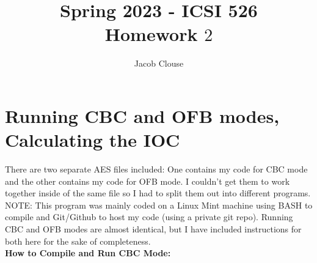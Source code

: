 \documentclass[10pt]{article}
\author{Jacob Clouse}
\title{Spring 2023 - ICSI 526\\Homework $2$}
\begin{document}
\maketitle

\section{Running CBC and OFB modes, Calculating the IOC}
\noindent There are two separate AES files included: One contains my code for CBC mode and the other contains my code for OFB mode. I couldn't get them to work together inside of the same file so I had to split them out into different programs. NOTE: This program was mainly coded on a Linux Mint machine using BASH to compile and Git/Github to host my code (using a private git repo). Running CBC and OFB modes are almost identical, but I have included instructions for both here for the sake of completeness. 
\vspace{0.2in}
\\
\noindent \textbf{How to Compile and Run CBC Mode: } 
\end{document}
